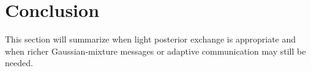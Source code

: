 \section{Conclusion}
\label{sec:conclusion}

This section will summarize when light posterior exchange is appropriate and when richer Gaussian-mixture messages or adaptive communication may still be needed.
